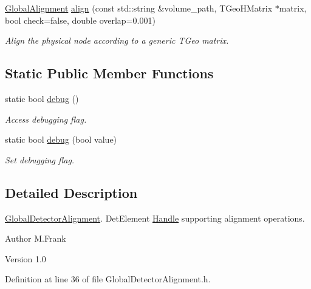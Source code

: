 \begin{DoxyCompactItemize}
\hyperlink{class_d_d4hep_1_1_alignments_1_1_global_alignment}{GlobalAlignment} \hyperlink{class_d_d4hep_1_1_alignments_1_1_global_detector_alignment_a843a0475def67045c62d9bfa74fbc20c}{align} (const std::string \&volume\_\-path, TGeoHMatrix $\ast$matrix, bool check=false, double overlap=0.001)
\begin{DoxyCompactList}\small\item\em Align the physical node according to a generic TGeo matrix. \item\end{DoxyCompactList}\end{DoxyCompactItemize}
\subsection*{Static Public Member Functions}
\begin{DoxyCompactItemize}
\item 
static bool \hyperlink{class_d_d4hep_1_1_alignments_1_1_global_detector_alignment_aeb175ec1d0dede0976111a2887c17fd6}{debug} ()
\begin{DoxyCompactList}\small\item\em Access debugging flag. \item\end{DoxyCompactList}\item 
static bool \hyperlink{class_d_d4hep_1_1_alignments_1_1_global_detector_alignment_af14b48c2d73add10f4b9dff410d6a5e0}{debug} (bool value)
\begin{DoxyCompactList}\small\item\em Set debugging flag. \item\end{DoxyCompactList}\end{DoxyCompactItemize}


\subsection{Detailed Description}
\hyperlink{class_d_d4hep_1_1_alignments_1_1_global_detector_alignment}{GlobalDetectorAlignment}. DetElement \hyperlink{class_d_d4hep_1_1_handle}{Handle} supporting alignment operations. \begin{DoxyAuthor}{Author}
M.Frank 
\end{DoxyAuthor}
\begin{DoxyVersion}{Version}
1.0 
\end{DoxyVersion}


Definition at line 36 of file GlobalDetectorAlignment.h.

